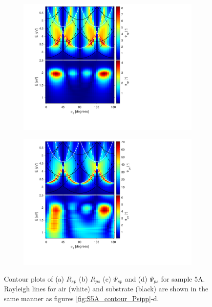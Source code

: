 \begin{figure}[h!]
    \begin{subfigure}{0.5\textwidth}
        \centering
        \includegraphics[width=\linewidth, trim=1.1cm  1.8cm 6.7cm 0cm, clip]{figures/ch4/S5A/contour/S5A_Psisp.pdf}
        \caption{}
    \end{subfigure}
    \begin{subfigure}{0.5\textwidth}
        \centering
        \includegraphics[width=\linewidth, trim=1.1cm  1.8cm 6.7cm 0cm, clip]{figures/ch4/S5A/contour/S5A_Psips.pdf}
        \caption{}
    \end{subfigure}
    \caption{Contour plots of (a) $R_{sp}$ (b) $R_{ps}$ (c) $\Psi_{sp}$ and (d) $\Psi_{ps}$ for sample 5A. Rayleigh lines for air (white) and substrate (black) are shown in the same manner as figures \ref{fig:S5A_contour_Psipp}-d.}
    \label{fig:S5A_contour_Psips&Psisp}
\end{figure}

